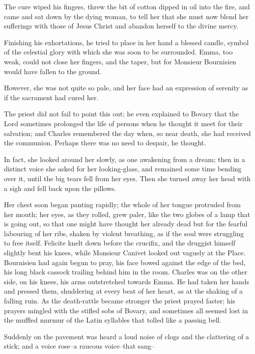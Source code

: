 \documentclass[11pt,twocolumn]{ltugboat}
\begin{document}
The cure wiped his fingers, threw the bit of cotton dipped in oil into
the fire, and came and sat down by the dying woman, to tell her that
she must now blend her sufferings with those of Jesus Christ and abandon
herself to the divine mercy.

Finishing his exhortations, he tried to place in her hand a blessed
candle, symbol of the celestial glory with which she was soon to be
surrounded. Emma, too weak, could not close her fingers, and the taper,
but for Monsieur Bournisien would have fallen to the ground.

However, she was not quite so pale, and her face had an expression of
serenity as if the sacrament had cured her.

The priest did not fail to point this out; he even explained to Bovary
that the Lord sometimes prolonged the life of persons when he thought it
meet for their salvation; and Charles remembered the day when, so near
death, she had received the communion. Perhaps there was no need to
despair, he thought.

In fact, she looked around her slowly, as one awakening from a dream;
then in a distinct voice she asked for her looking-glass, and remained
some time bending over it, until the big tears fell from her eyes. Then
she turned away her head with a sigh and fell back upon the pillows.

Her chest soon began panting rapidly; the whole of her tongue protruded
from her mouth; her eyes, as they rolled, grew paler, like the two
globes of a lamp that is going out, so that one might have thought
her already dead but for the fearful labouring of her ribs, shaken
by violent breathing, as if the soul were struggling to free itself.
Felicite knelt down before the crucifix, and the druggist himself
slightly bent his knees, while Monsieur Canivet looked out vaguely at
the Place. Bournisien had again begun to pray, his face bowed against
the edge of the bed, his long black cassock trailing behind him in the
room. Charles was on the other side, on his knees, his arms outstretched
towards Emma. He had taken her hands and pressed them, shuddering at
every beat of her heart, as at the shaking of a falling ruin. As the
death-rattle became stronger the priest prayed faster; his prayers
mingled with the stifled sobs of Bovary, and sometimes all seemed lost
in the muffled murmur of the Latin syllables that tolled like a passing
bell.

Suddenly on the pavement was heard a loud noise of clogs and the
clattering of a stick; and a voice rose--a raucous voice--that sang--
\end{document}
